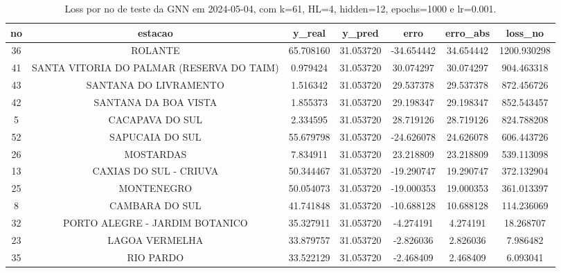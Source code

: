 \begin{table}[h]
\centering
\caption{Loss por no de teste da GNN em 2024-05-04, com k=61, HL=4, hidden=12, epochs=1000 e lr=0.001.}
\label{tab:gnn_loss_k61_hl4_h12_e1000_d20240504}
\begin{tabular}{ccccccc}
\toprule
no & estacao & y\_real & y\_pred & erro & erro\_abs & loss\_no \\
\midrule
36 & ROLANTE & 65.708160 & 31.053720 & -34.654442 & 34.654442 & 1200.930298 \\
41 & SANTA VITORIA DO PALMAR (RESERVA DO TAIM) & 0.979424 & 31.053720 & 30.074297 & 30.074297 & 904.463318 \\
43 & SANTANA DO LIVRAMENTO & 1.516342 & 31.053720 & 29.537378 & 29.537378 & 872.456726 \\
42 & SANTANA DA BOA VISTA & 1.855373 & 31.053720 & 29.198347 & 29.198347 & 852.543457 \\
5 & CACAPAVA DO SUL & 2.334595 & 31.053720 & 28.719126 & 28.719126 & 824.788208 \\
52 & SAPUCAIA DO SUL & 55.679798 & 31.053720 & -24.626078 & 24.626078 & 606.443726 \\
26 & MOSTARDAS & 7.834911 & 31.053720 & 23.218809 & 23.218809 & 539.113098 \\
13 & CAXIAS DO SUL - CRIUVA & 50.344467 & 31.053720 & -19.290747 & 19.290747 & 372.132904 \\
25 & MONTENEGRO & 50.054073 & 31.053720 & -19.000353 & 19.000353 & 361.013397 \\
8 & CAMBARA DO SUL & 41.741848 & 31.053720 & -10.688128 & 10.688128 & 114.236069 \\
32 & PORTO ALEGRE - JARDIM BOTANICO & 35.327911 & 31.053720 & -4.274191 & 4.274191 & 18.268707 \\
23 & LAGOA VERMELHA & 33.879757 & 31.053720 & -2.826036 & 2.826036 & 7.986482 \\
35 & RIO PARDO & 33.522129 & 31.053720 & -2.468409 & 2.468409 & 6.093041 \\
\bottomrule
\end{tabular}
\end{table}
